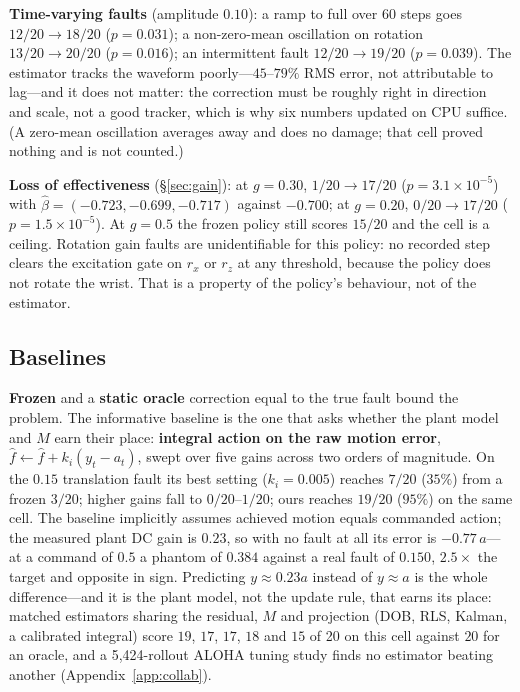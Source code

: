 \documentclass{article}
\newcommand{\fhat}{\hat{f}}
\begin{document}
\textbf{Time-varying faults} (amplitude $0.10$): a ramp to full over 60 steps goes
$12/20\to18/20$ ($p=0.031$); a non-zero-mean oscillation on rotation $13/20\to20/20$
($p=0.016$); an intermittent fault $12/20\to19/20$ ($p=0.039$). The estimator tracks the
waveform poorly---$45$--$79\%$ RMS error, not attributable to lag---and it does not matter:
the correction must be roughly right in direction and scale, not a good tracker, which is
why six numbers updated on CPU suffice. (A zero-mean oscillation averages away and does no
damage; that cell proved nothing and is not counted.)

\textbf{Loss of effectiveness} (\S\ref{sec:gain}): at $g=0.30$, $1/20\to17/20$
($p=3.1\times10^{-5}$) with $\hat\beta = (-0.723,-0.699,-0.717)$ against $-0.700$; at
$g=0.20$, $0/20\to17/20$ ($p=1.5\times10^{-5}$). At $g=0.5$ the frozen policy still scores
$15/20$ and the cell is a ceiling. Rotation gain faults are unidentifiable for this policy:
no recorded step clears the excitation gate on $r_x$ or $r_z$ at any threshold, because the
policy does not rotate the wrist. That is a property of the policy's behaviour, not of the
estimator.

\subsection{Baselines}
\label{sec:baselines}

\textbf{Frozen} and a \textbf{static oracle} correction equal to the true fault bound the
problem. The informative baseline is the one that asks whether the plant model and $M$ earn
their place: \textbf{integral action on the raw motion error}, $\fhat \leftarrow \fhat +
k_i(y_t - a_t)$, swept over five gains across two orders of magnitude. On the $0.15$
translation fault its best setting ($k_i=0.005$) reaches $7/20$ ($35\%$) from a frozen
$3/20$; higher gains fall to $0/20$--$1/20$; ours reaches $19/20$ ($95\%$) on the same
cell. The baseline implicitly assumes achieved motion equals commanded action; the measured plant
DC gain is $0.23$, so with no fault at all its error is $-0.77\,a$---at a command of $0.5$
a phantom of $0.384$ against a real fault of $0.150$, $2.5\times$ the target and opposite in
sign. Predicting $y\approx0.23a$ instead of $y\approx a$ is the whole difference---and it is
the plant model, not the update rule, that earns its place: matched estimators sharing the
residual, $M$ and projection (DOB, RLS, Kalman, a calibrated integral) score $19$, $17$, $17$,
$18$ and $15$ of 20 on this cell against $20$ for an oracle, and a 5,424-rollout ALOHA tuning
study finds no estimator beating another (Appendix~\ref{app:collab}).
\end{document}

